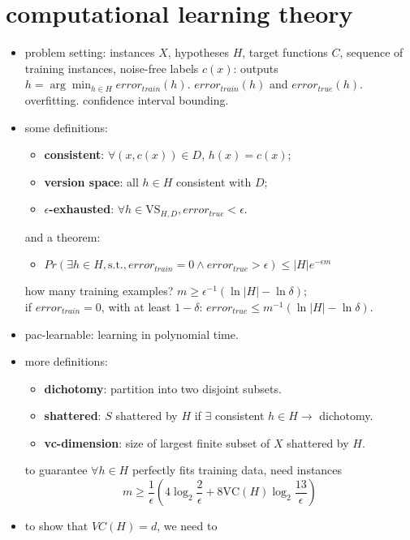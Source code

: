 \documentclass{article}
\begin{document}
\section{computational learning theory}
\begin{itemize}
	\item problem setting: instances $X$, hypotheses $H$, target functions $C$, sequence
		of training instances, noise-free labels $c(x)$: outputs $h=\arg\min_{h\in H}error_{train}(h)$.			
		$error_{train}(h)$ and $error_{true}(h)$. overfitting. confidence interval bounding. 
	\item some definitions: 
		\begin{itemize}
			\item {\bf consistent}: $\forall(x,c(x))\in D$, $h(x)=c(x)$; 
			\item {\bf version space}: all $h\in H$ consistent with $D$;
			\item {\bf $\epsilon$-exhausted}: $\forall h\in \text{VS}_{H,D}, error_{true}<\epsilon$. 
		\end{itemize}
		and a theorem: 
		\begin{itemize}
			\item $Pr\left(\exists h\in H, \text{s.t.}, error_{train}=0\wedge error_{true}>
				\epsilon\right)\le|H|e^{-\epsilon m}$
		\end{itemize}
		how many training examples? $m\ge\epsilon^{-1}\left(\ln|H|-\ln\delta\right)$; \\
		if $error_{train}=0$, with at least $1-\delta$: $error_{true}\le m^{-1}\left(\ln|H|-\ln\delta\right)$.
	\item pac-learnable: learning in polynomial time.
	\item more definitions: 
		\begin{itemize}
			\item {\bf dichotomy}: partition into two disjoint subsets. 
			\item {\bf shattered}: $S$ shattered by $H$ if $\exists$ consistent $h\in H\rightarrow$ dichotomy. 
			\item {\bf vc-dimension}: size of largest finite subset of $X$ shattered by $H$. 
		\end{itemize}
		to guarantee $\forall h\in H$ perfectly fits training data, need instances
		\begin{equation}
			m\ge\frac1{\epsilon}\left(4\log_2\frac2{\epsilon}+8\text{VC}(H)\log_2\frac{13}{\epsilon}\right)
		\end{equation}
	\item to show that $VC(H)=d$, we need to 

\end{itemize}
\end{document}
